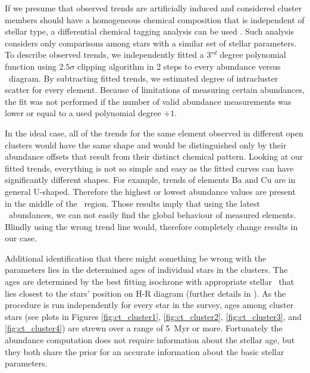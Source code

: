 If we presume that observed trends are artificially induced and considered cluster members should have a homogeneous chemical composition that is independent of stellar type, a differential chemical tagging analysis can be used \cite{2019arXiv191208539C}. Such analysis considers only comparisons among stars with a similar set of stellar parameters. To describe observed trends, we independently fitted a 3$^{rd}$ degree polynomial function using $2.5\sigma$ clipping algorithm in 2 steps to every abundance versus \Teff\ diagram. By subtracting fitted trends, we estimated degree of intracluster scatter for every element. Because of limitations of measuring certain abundances, the fit was not performed if the number of valid abundance measurements was lower or equal to a used polynomial degree $+1$.

In the ideal case, all of the trends for the same element observed in different open clusters would have the same shape and would be distinguished only by their abundance offsets that result from their distinct chemical pattern. Looking at our fitted trends, everything is not so simple and easy as the fitted curves can have significantly different shapes. For example, trends of elements Ba and Cu are in general U-shaped. Therefore the highest or lowest abundance values are present in the middle of the \Teff\ region. Those results imply that using the latest \Gh\ abundances, we can not easily find the global behaviour of measured elements. Blindly using the wrong trend line would, therefore completely change results in our case.

Additional identification that there might something be wrong with the parameters lies in the determined ages of individual stars in the clusters. The ages are determined by the best fitting isochrone with appropriate stellar \Feh\ that lies closest to the stars' position on H-R diagram (further details in \citet{buder2020}). As the procedure is run independently for every star in the survey, ages among cluster stars (see plots in Figures \ref{fig:ct_cluster1}, \ref{fig:ct_cluster2}, \ref{fig:ct_cluster3}, and \ref{fig:ct_cluster4}) are strewn over a range of 5~Myr or more. Fortunately the abundance computation does not require information about the stellar age, but they both share the prior for an accurate information about the basic stellar parameters.


